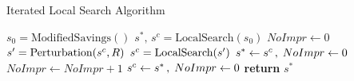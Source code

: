 \begin{algorithm}[ht]
    \caption{Iterated Local Search Algorithm}\label{alg:principal_ILS}
    \begin{algorithmic}[1]
        \State $s_0 = \text{ModifiedSavings}()$ 
        \State $s^*,\,s^c = \text{LocalSearch}(s_0)$
        \State $NoImpr \leftarrow 0$
        \State $s\sp{\prime}  = \text{Perturbation}(s^c,R)$ 
        \State $s\sp{c} = \text{LocalSearch}(s\sp{\prime})$
        \State{}
         
        \State $s^* \gets s\sp{c}\,,\;NoImpr \gets 0$
        \Else
        \State $NoImpr \gets NoImpr + 1$
        \State $s^c \gets s\sp{*}\,,\;NoImpr \gets 0$ 
        \EndIf
        \EndIf
        \EndWhile
        \State \textbf{return} $s^*$
        \EndProcedure
    \end{algorithmic}
\end{algorithm}
